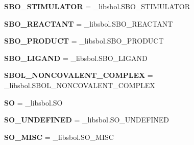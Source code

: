 \begin{DoxyCompactItemize}
\item 
{\bfseries S\+B\+O\+\_\+\+S\+T\+I\+M\+U\+L\+A\+T\+OR} = \+\_\+libsbol.\+S\+B\+O\+\_\+\+S\+T\+I\+M\+U\+L\+A\+T\+OR\hypertarget{namespacesbol_1_1libsbol_a11aef9571db918ac4a8a424be6d9df3d}{}\label{namespacesbol_1_1libsbol_a11aef9571db918ac4a8a424be6d9df3d}

\item 
{\bfseries S\+B\+O\+\_\+\+R\+E\+A\+C\+T\+A\+NT} = \+\_\+libsbol.\+S\+B\+O\+\_\+\+R\+E\+A\+C\+T\+A\+NT\hypertarget{namespacesbol_1_1libsbol_a5d693071361223fa36ba08521fb61b75}{}\label{namespacesbol_1_1libsbol_a5d693071361223fa36ba08521fb61b75}

\item 
{\bfseries S\+B\+O\+\_\+\+P\+R\+O\+D\+U\+CT} = \+\_\+libsbol.\+S\+B\+O\+\_\+\+P\+R\+O\+D\+U\+CT\hypertarget{namespacesbol_1_1libsbol_a2330b2a3d7bfd092e96e1e9afed34076}{}\label{namespacesbol_1_1libsbol_a2330b2a3d7bfd092e96e1e9afed34076}

\item 
{\bfseries S\+B\+O\+\_\+\+L\+I\+G\+A\+ND} = \+\_\+libsbol.\+S\+B\+O\+\_\+\+L\+I\+G\+A\+ND\hypertarget{namespacesbol_1_1libsbol_a2e24a6fa264cd7824952e6fda12d0c3d}{}\label{namespacesbol_1_1libsbol_a2e24a6fa264cd7824952e6fda12d0c3d}

\item 
{\bfseries S\+B\+O\+L\+\_\+\+N\+O\+N\+C\+O\+V\+A\+L\+E\+N\+T\+\_\+\+C\+O\+M\+P\+L\+EX} = \+\_\+libsbol.\+S\+B\+O\+L\+\_\+\+N\+O\+N\+C\+O\+V\+A\+L\+E\+N\+T\+\_\+\+C\+O\+M\+P\+L\+EX\hypertarget{namespacesbol_1_1libsbol_a63d18906b2dba9ded6ad4be811c2e886}{}\label{namespacesbol_1_1libsbol_a63d18906b2dba9ded6ad4be811c2e886}

\item 
{\bfseries SO} = \+\_\+libsbol.\+SO\hypertarget{namespacesbol_1_1libsbol_ae0e14839bea004b256c63ff6063a5619}{}\label{namespacesbol_1_1libsbol_ae0e14839bea004b256c63ff6063a5619}

\item 
{\bfseries S\+O\+\_\+\+U\+N\+D\+E\+F\+I\+N\+ED} = \+\_\+libsbol.\+S\+O\+\_\+\+U\+N\+D\+E\+F\+I\+N\+ED\hypertarget{namespacesbol_1_1libsbol_ae7dd3292d5bf63c4f6bba766db1d2fe9}{}\label{namespacesbol_1_1libsbol_ae7dd3292d5bf63c4f6bba766db1d2fe9}

\item 
{\bfseries S\+O\+\_\+\+M\+I\+SC} = \+\_\+libsbol.\+S\+O\+\_\+\+M\+I\+SC\hypertarget{namespacesbol_1_1libsbol_a5566d6cc089629509aa92bf8b44f36ea}{}\label{namespacesbol_1_1libsbol_a5566d6cc089629509aa92bf8b44f36ea}


\end{DoxyCompactItemize}
